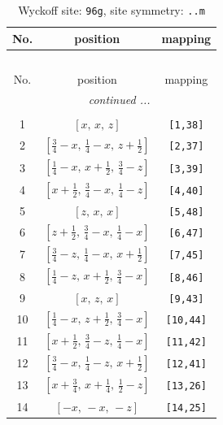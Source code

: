 \documentclass[fleqn,8pt]{jsarticle}
\begin{document}
\begin{longtable}{ccc}
\caption{Wyckoff site: {\tt 96g}, site symmetry: {\tt ..m}}
 \\
 \hline \hline
No. & position & mapping \\ \hline \endfirsthead

\multicolumn{2}{l}{\tablename\ \thetable{}} \\
 \hline \hline
No. & position & mapping \\ \hline \endhead

 \hline \hline
\multicolumn{2}{r}{\footnotesize\it continued ...} \\ \endfoot

 \hline \hline
\multicolumn{2}{r}{} \\ \endlastfoot

1 & $\left[ x,\, x,\, z \right]$ & {\tt [1,38]} \\ \hline
2 & $\left[ \frac{3}{4} - x,\, \frac{1}{4} - x,\, z + \frac{1}{2} \right]$ & {\tt [2,37]} \\ \hline
3 & $\left[ \frac{1}{4} - x,\, x + \frac{1}{2},\, \frac{3}{4} - z \right]$ & {\tt [3,39]} \\ \hline
4 & $\left[ x + \frac{1}{2},\, \frac{3}{4} - x,\, \frac{1}{4} - z \right]$ & {\tt [4,40]} \\ \hline
5 & $\left[ z,\, x,\, x \right]$ & {\tt [5,48]} \\ \hline
6 & $\left[ z + \frac{1}{2},\, \frac{3}{4} - x,\, \frac{1}{4} - x \right]$ & {\tt [6,47]} \\ \hline
7 & $\left[ \frac{3}{4} - z,\, \frac{1}{4} - x,\, x + \frac{1}{2} \right]$ & {\tt [7,45]} \\ \hline
8 & $\left[ \frac{1}{4} - z,\, x + \frac{1}{2},\, \frac{3}{4} - x \right]$ & {\tt [8,46]} \\ \hline
9 & $\left[ x,\, z,\, x \right]$ & {\tt [9,43]} \\ \hline
10 & $\left[ \frac{1}{4} - x,\, z + \frac{1}{2},\, \frac{3}{4} - x \right]$ & {\tt [10,44]} \\ \hline
11 & $\left[ x + \frac{1}{2},\, \frac{3}{4} - z,\, \frac{1}{4} - x \right]$ & {\tt [11,42]} \\ \hline
12 & $\left[ \frac{3}{4} - x,\, \frac{1}{4} - z,\, x + \frac{1}{2} \right]$ & {\tt [12,41]} \\ \hline
13 & $\left[ x + \frac{3}{4},\, x + \frac{1}{4},\, \frac{1}{2} - z \right]$ & {\tt [13,26]} \\ \hline
14 & $\left[ - x,\, - x,\, - z \right]$ & {\tt [14,25]} \\ \hline

\end{longtable}
\end{document}
